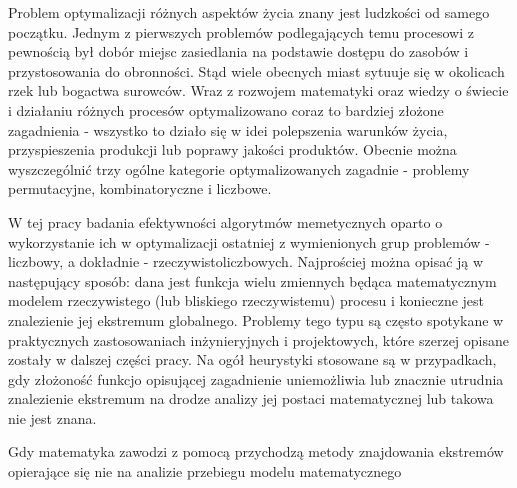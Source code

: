 \par
Problem optymalizacji różnych aspektów życia znany jest ludzkości od samego początku. Jednym z pierwszych problemów podlegających temu procesowi z pewnością był dobór miejsc zasiedlania na podstawie dostępu do zasobów i przystosowania do obronności. Stąd wiele obecnych miast sytuuje się w okolicach rzek lub bogactwa surowców. Wraz z rozwojem matematyki oraz wiedzy o świecie i działaniu różnych procesów optymalizowano coraz to bardziej złożone zagadnienia - wszystko to działo się w idei polepszenia warunków życia, przyspieszenia produkcji lub poprawy jakości produktów. Obecnie można wyszczególnić trzy ogólne kategorie optymalizowanych zagadnie - problemy permutacyjne, kombinatoryczne i liczbowe. 
\par
W tej pracy badania efektywności algorytmów memetycznych oparto o wykorzystanie ich w optymalizacji ostatniej z wymienionych grup problemów - liczbowy, a dokładnie - rzeczywistoliczbowych. Najprościej można opisać ją w następujący sposób: dana jest funkcja wielu zmiennych będąca matematycznym modelem rzeczywistego (lub bliskiego rzeczywistemu) procesu i konieczne jest znalezienie jej ekstremum globalnego. Problemy tego typu są często spotykane w praktycznych zastosowaniach inżynieryjnych i projektowych, które szerzej opisane zostały w dalszej części pracy. Na ogół heurystyki stosowane są w przypadkach, gdy złożoność funkcjo opisującej zagadnienie uniemożliwia lub znacznie utrudnia znalezienie ekstremum na drodze analizy jej postaci matematycznej lub takowa nie jest znana. 
\par
Gdy matematyka zawodzi z pomocą przychodzą metody znajdowania ekstremów opierające się nie na analizie przebiegu modelu matematycznego
